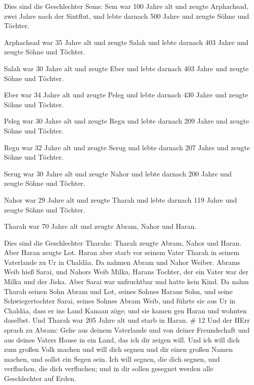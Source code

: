  Dies sind die Geschlechter Sems: Sem war 100 Jahre alt und
zeugte Arphachsad, zwei Jahre nach der Sintflut,  und lebte
darnach 500 Jahre und zeugte Söhne und Töchter.

 Arphachsad war 35 Jahre alt und zeugte Salah 
und lebte darnach 403 Jahre und zeugte Söhne und Töchter.

 Salah war 30 Jahre alt und zeugte Eber  und
lebte darnach 403 Jahre und zeugte Söhne und Töchter.

 Eber war 34 Jahre alt und zeugte Peleg  und
lebte darnach 430 Jahre und zeugte Söhne und Töchter.

 Peleg war 30 Jahre alt und zeugte Regu  und
lebte darnach 209 Jahre und zeugte Söhne und Töchter.

 Regu war 32 Jahre alt und zeugte Serug  und
lebte darnach 207 Jahre und zeugte Söhne und Töchter.

 Serug war 30 Jahre alt und zeugte Nahor  und
lebte darnach 200 Jahre und zeugte Söhne und Töchter.

 Nahor war 29 Jahre alt und zeugte Tharah  und
lebte darnach 119 Jahre und zeugte Söhne und Töchter.

 Tharah war 70 Jahre alt und zeugte Abram, Nahor und Haran.

 Dies sind die Geschlechter Tharahs: Tharah zeugte Abram,
Nahor und Haran. Aber Haran zeugte Lot.  Haran aber starb
vor seinem Vater Tharah in seinem Vaterlande zu Ur in Chaldäa.
 Da nahmen Abram und Nahor Weiber. Abrams Weib hieß Sarai,
und Nahors Weib Milka, Harans Tochter, der ein Vater war der Milka und
der Jiska.  Aber Sarai war unfruchtbar und hatte kein Kind.
 Da nahm Tharah seinen Sohn Abram und Lot, seines Sohnes
Harans Sohn, und seine Schwiegertochter Sarai, seines Sohnes Abram Weib,
und führte sie aus Ur in Chaldäa, dass er ins Land Kanaan zöge; und sie
kamen gen Haran und wohnten daselbst.  Und Tharah war 205
Jahre alt und starb in Haran. \# 12  Und der HErr sprach zu
Abram: Gehe aus deinem Vaterlande und von deiner Freundschaft und aus
deines Vaters Hause in ein Land, das ich dir zeigen will. 
Und ich will dich zum großen Volk machen und will dich segnen und dir
einen großen Namen machen, und sollst ein Segen sein.  Ich
will segnen, die dich segnen, und verfluchen, die dich verfluchen; und
in dir sollen gesegnet werden alle Geschlechter auf Erden.


